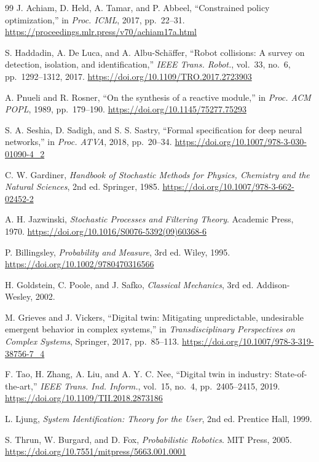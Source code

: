 \documentclass[11pt]{article}
\begin{document}
\begin{thebibliography}{99}
J. Achiam, D. Held, A. Tamar, and P. Abbeel,
``Constrained policy optimization,''
in \emph{Proc. ICML}, 2017, pp.~22--31.
\url{https://proceedings.mlr.press/v70/achiam17a.html}

S. Haddadin, A. De Luca, and A. Albu-Sch\"{a}ffer,
``Robot collisions: A survey on detection, isolation, and identification,''
\emph{IEEE Trans. Robot.}, vol.~33, no.~6, pp.~1292--1312, 2017.
\url{https://doi.org/10.1109/TRO.2017.2723903}

A. Pnueli and R. Rosner,
``On the synthesis of a reactive module,''
in \emph{Proc. ACM POPL}, 1989, pp.~179--190.
\url{https://doi.org/10.1145/75277.75293}

S. A. Seshia, D. Sadigh, and S. S. Sastry,
``Formal specification for deep neural networks,''
in \emph{Proc. ATVA}, 2018, pp.~20--34.
\url{https://doi.org/10.1007/978-3-030-01090-4_2}

C. W. Gardiner,
\emph{Handbook of Stochastic Methods for Physics, Chemistry and the Natural
Sciences}, 2nd ed. Springer, 1985.
\url{https://doi.org/10.1007/978-3-662-02452-2}

A. H. Jazwinski,
\emph{Stochastic Processes and Filtering Theory}. Academic Press, 1970.
\url{https://doi.org/10.1016/S0076-5392(09)60368-6}

P. Billingsley,
\emph{Probability and Measure}, 3rd ed. Wiley, 1995.
\url{https://doi.org/10.1002/9780470316566}

H. Goldstein, C. Poole, and J. Safko,
\emph{Classical Mechanics}, 3rd ed. Addison-Wesley, 2002.

M. Grieves and J. Vickers,
``Digital twin: Mitigating unpredictable, undesirable emergent behavior in
complex systems,''
in \emph{Transdisciplinary Perspectives on Complex Systems}, Springer, 2017,
pp.~85--113.
\url{https://doi.org/10.1007/978-3-319-38756-7_4}

F. Tao, H. Zhang, A. Liu, and A. Y. C. Nee,
``Digital twin in industry: State-of-the-art,''
\emph{IEEE Trans. Ind. Inform.}, vol.~15, no.~4, pp.~2405--2415, 2019.
\url{https://doi.org/10.1109/TII.2018.2873186}

L. Ljung,
\emph{System Identification: Theory for the User}, 2nd ed.
Prentice Hall, 1999.

S. Thrun, W. Burgard, and D. Fox,
\emph{Probabilistic Robotics}. MIT Press, 2005.
\url{https://doi.org/10.7551/mitpress/5663.001.0001}


\end{thebibliography}
\end{document}
